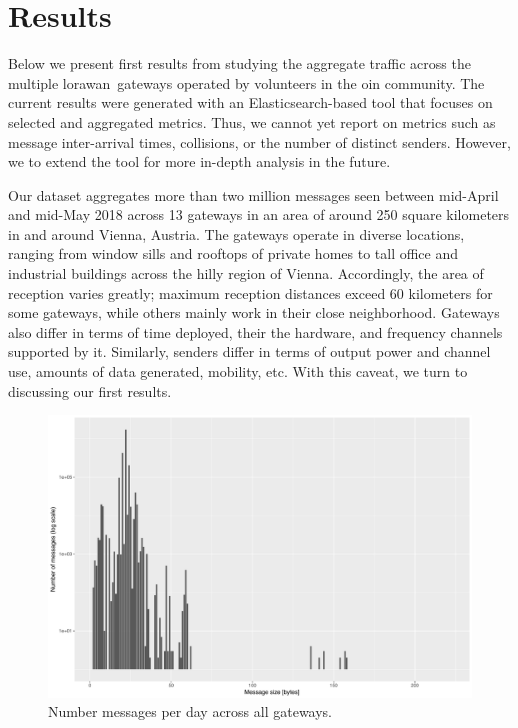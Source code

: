 \section{Results}\label{sec:results}

Below we present first results from studying the aggregate
traffic across the multiple \gls{lorawan} gateways operated
by volunteers in the \gls{oin} community.
The current results were generated with an Elasticsearch-based
tool that focuses on selected and aggregated metrics.
Thus, we
cannot yet report on metrics such as message inter-arrival times,
collisions, or the number of distinct senders. However, we
to extend the tool for more in-depth analysis in the future.

Our dataset aggregates more than two million messages seen between
mid-April and mid-May 2018 across 13 gateways in an area of around
250 square kilometers in and around Vienna, Austria.
The gateways operate in diverse locations, ranging from window sills
and rooftops of private homes to tall office and industrial buildings
across the hilly region of Vienna. Accordingly, the area of reception
varies greatly; maximum reception distances exceed 60 kilometers for
some gateways, while others mainly work in their close neighborhood.
Gateways also differ in terms of time deployed, their the hardware, and
frequency channels supported by it. Similarly, senders differ
in terms of output power and channel use, amounts of data generated,
mobility, etc.
With this caveat, we turn to discussing our first results.

\begin{figure}
  \centering
  \includegraphics[width=\columnwidth]{figures/sizes.pdf}
  \caption{Number messages per day across all gateways.}
  \label{fig:sizes}
\end{figure}

